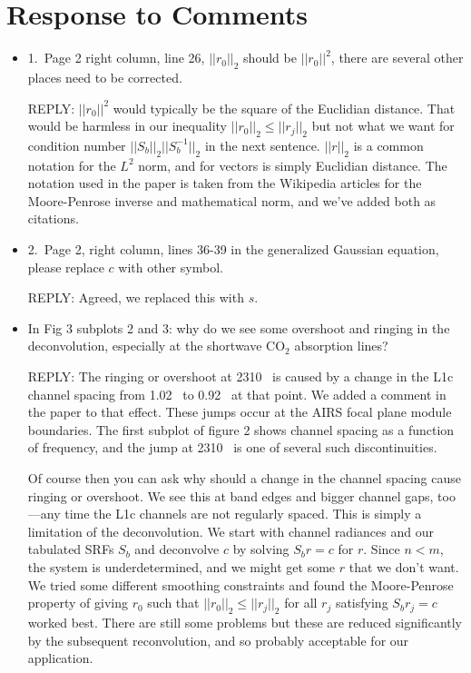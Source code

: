 \documentclass[11pt]{article}
\newcommand {\reply} {\mbox{\small REPLY}}
\begin{document}
\section{Response to Comments}

\begin{itemize}
  \item 1.~Page 2 right column, line 26, $||r_0||_2$ should be
    $||r_0||^2$, there are several other places need to be
    corrected.

    \reply: $||r_0||^2$ would typically be the square of the
    Euclidian distance.  That would be harmless in our inequality
    $||r_0||_2 \le ||r_j||_2$ but not what we want for condition
    number $||S_b||_2||S_b^{-1}||_2$ in the next sentence.
    $||r||_2$ is a common notation for the $L^2$ norm, and for
    vectors is simply Euclidian distance.  The notation used in the
    paper is taken from the Wikipedia articles for the Moore-Penrose
    inverse and mathematical norm, and we've added both as
    citations.


  \item 2.~Page 2, right column, lines 36-39 in the generalized
    Gaussian equation, please replace $c$ with other symbol.

    \reply: Agreed, we replaced this with $s$.

  \item In Fig 3 subplots 2 and 3: why do we see some overshoot
    and ringing in the deconvolution, especially at the shortwave
    CO$_2$ absorption lines?

    \reply: The ringing or overshoot at 2310~{\wn} is caused by a
    change in the L1c channel spacing from 1.02~{\wn} to 0.92~{\wn}
    at that point.  We added a comment in the paper to that effect.
    These jumps occur at the AIRS focal plane module boundaries.
    The first subplot of figure 2 shows channel spacing as a
    function of frequency, and the jump at 2310~{\wn} is one of
    several such discontinuities.  

    Of course then you can ask why should a change in the channel
    spacing cause ringing or overshoot.  We see this at band edges
    and bigger channel gaps, too---any time the L1c channels are not
    regularly spaced.  This is simply a limitation of the
    deconvolution.  We start with channel radiances and our
    tabulated SRFs $S_b$ and deconvolve $c$ by solving $S_b r = c$
    for $r$.  Since $n < m$, the system is underdetermined, and we
    might get some $r$ that we don't want.  We tried some different
    smoothing constraints and found the Moore-Penrose property of
    giving $r_0$ such that $||r_0||_2 \le ||r_j||_2$ for all $r_j$
    satisfying $S_b r_j = c$ worked best.  There are still some
    problems but these are reduced significantly by the subsequent
    reconvolution, and so probably acceptable for our application.


\end{itemize}
\end{document}
